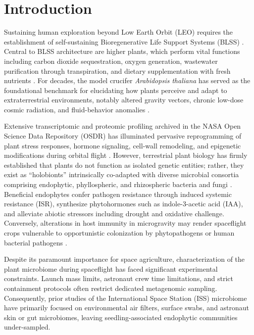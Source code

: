 \section{Introduction}
\label{sec:intro}

Sustaining human exploration beyond Low Earth Orbit (LEO) requires the establishment of self-sustaining Bioregenerative Life Support Systems (BLSS) \citep{fu2016how}. Central to BLSS architecture are higher plants, which perform vital functions including carbon dioxide sequestration, oxygen generation, wastewater purification through transpiration, and dietary supplementation with fresh nutrients \citep{paul2017genetic,dixit2021persistence}. For decades, the model crucifer \textit{Arabidopsis thaliana} has served as the foundational benchmark for elucidating how plants perceive and adapt to extraterrestrial environments, notably altered gravity vectors, chronic low-dose cosmic radiation, and fluid-behavior anomalies \citep{choi2019variation,kruse2020spaceflight}.

Extensive transcriptomic and proteomic profiling archived in the NASA Open Science Data Repository (OSDR) has illuminated pervasive reprogramming of plant stress responses, hormone signaling, cell-wall remodeling, and epigenetic modifications during orbital flight \citep{barker2023meta,zhou2019epigenomics,olanrewaju2023integrative}. However, terrestrial plant biology has firmly established that plants do not function as isolated genetic entities; rather, they exist as ``holobionts'' intrinsically co-adapted with diverse microbial consortia comprising endophytic, phyllospheric, and rhizospheric bacteria and fungi \citep{dezelicourt2013rhizosphere,pieterse2014induced}. Beneficial endophytes confer pathogen resistance through induced systemic resistance (ISR), synthesize phytohormones such as indole-3-acetic acid (IAA), and alleviate abiotic stressors including drought and oxidative challenge. Conversely, alterations in host immunity in microgravity may render spaceflight crops vulnerable to opportunistic colonization by phytopathogens or human bacterial pathogens \citep{totsline2023microgravity,totsline2024simulated}.

Despite its paramount importance for space agriculture, characterization of the plant microbiome during spaceflight has faced significant experimental constraints. Launch mass limits, astronaut crew time limitations, and strict containment protocols often restrict dedicated metagenomic sampling. Consequently, prior studies of the International Space Station (ISS) microbiome have primarily focused on environmental air filters, surface swabs, and astronaut skin or gut microbiomes, leaving seedling-associated endophytic communities under-sampled.

